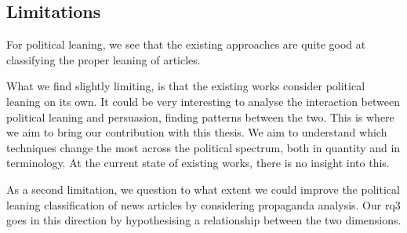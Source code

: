 







\subsection{\statusgreen Limitations}

For political leaning, we see that the existing approaches are quite good at classifying the proper leaning of articles.

What we find slightly limiting, is that the existing works consider political leaning on its own. It could be very interesting to analyse the interaction between political leaning and persuasion, finding patterns between the two. This is where we aim to bring our contribution with this thesis.
We aim to understand which techniques change the most across the political spectrum, both in quantity and in terminology. At the current state of existing works, there is no insight into this.

As a second limitation, we question to what extent we could improve the political leaning classification of news articles by considering propaganda analysis.
Our \acrshort{rq}3 goes in this direction by hypothesising a relationship between the two dimensions.



